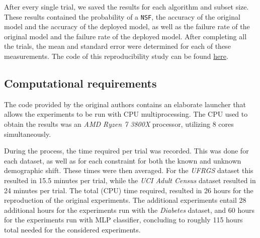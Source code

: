 After every single trial, we saved the results for each algorithm and subset size. These results contained the probability of a \verb|NSF|, the accuracy of the original model and the accuracy of the deployed model, as well as the failure rate of the original model and the failure rate of the deployed model. After completing all the trials, the mean and standard error were determined for each of these measurements. The code of this reproducibility study can be found \href{https://anonymous.4open.science/r/fact_guarantee-DB57/}{here}.

\subsection{Computational requirements}
The code provided by the original authors contains an elaborate launcher that allows the experiments to be run with CPU multiprocessing. The CPU used to obtain the results was an \textit{AMD Ryzen 7 3800X} processor, utilizing 8 cores simultaneously. 

During the process, the time required per trial was recorded. This was done for each dataset, as well as for each constraint for both the known and unknown demographic shift. These times were then averaged. For the \textit{UFRGS} dataset this resulted in 15.5 minutes per trial, while the \textit{UCI Adult Census} dataset resulted in 24 minutes per trial. The total (CPU) time required, resulted in 26 hours for the reproduction of the original experiments. The additional experiments entail 28 additional hours for the experiments run with the \textit{Diabetes} dataset, and 60 hours for the experiments run with MLP classifier, concluding to roughly 115 hours total needed for the considered experiments.

